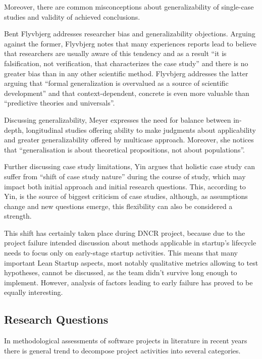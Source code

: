 \documentclass{article}
\begin{document}
Moreover, there are common misconceptions about generalizability of single-case studies and validity of achieved conclusions.

Bent Flyvbjerg \cite{flyvbjerg2006five} addresses researcher bias and generalizability objections. Arguing against the former, Flyvbjerg notes that many experiences reports lead to believe that researchers are usually aware of this tendency and as a result ``it is falsification, not verification, that characterizes the case study'' and there is no greater bias than in any other scientific method. Flyvbjerg addresses the latter arguing that ``formal generalization is overvalued as a source of scientific development'' and that context-dependent, concrete is even more valuable than ``predictive theories and universals''.

Discussing generalizability, Meyer\cite{meyer2001case} expresses the need for balance between in-depth, longitudinal studies offering ability to make judgments about applicability and greater generalizability offered by multicase approach. Moreover, she notices that ``generalisation is about theoretical propositions, not about populations''.

Further discussing case study limitations, Yin\cite{yin2013case} argues that holistic case study can suffer from ``shift of case study nature'' during the course of study, which may impact both initial approach and initial research questions. This, according to Yin, is the source of biggest criticism of case studies, although, as assumptions change and new questions emerge, this flexibility can also be considered a strength.

This shift has certainly taken place during DNCR project, because due to the project failure intended discussion about methods applicable in startup's lifecycle needs to focus only on early-stage startup activities. This means that many important Lean Startup aspects, most notably qualitative metrics allowing to test hypotheses, cannot be discussed, as the team didn't survive long enough to implement. However, analysis of factors leading to early failure has proved to be equally interesting.

\subsection{Research Questions}
In methodological assessments of software projects in literature in recent years there is general trend to decompose project activities into several categories.
\end{document}
